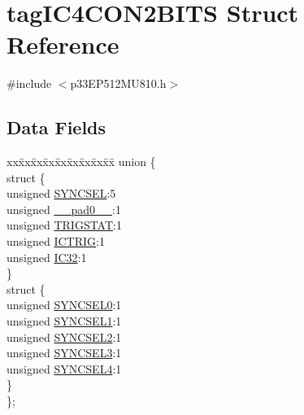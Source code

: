 \hypertarget{structtag_i_c4_c_o_n2_b_i_t_s}{}\section{tag\+I\+C4\+C\+O\+N2\+B\+I\+TS Struct Reference}
\label{structtag_i_c4_c_o_n2_b_i_t_s}


{\ttfamily \#include $<$p33\+E\+P512\+M\+U810.\+h$>$}

\subsection*{Data Fields}
\begin{DoxyCompactItemize}
\item 
\begin{tabbing}
xx\=xx\=xx\=xx\=xx\=xx\=xx\=xx\=xx\=\kill
union \{\\
\>struct \{\\
\>\>unsigned \hyperlink{structtag_i_c4_c_o_n2_b_i_t_s_a35fbbe11485c2615ed27535b62c3fa35}{SYNCSEL}:5\\
\>\>unsigned \hyperlink{structtag_i_c4_c_o_n2_b_i_t_s_adf71f3d8410c1f1dbbc96680a92c49af}{\_\_pad0\_\_}:1\\
\>\>unsigned \hyperlink{structtag_i_c4_c_o_n2_b_i_t_s_ab379549de54ac93ad4aa73686c34cb7c}{TRIGSTAT}:1\\
\>\>unsigned \hyperlink{structtag_i_c4_c_o_n2_b_i_t_s_a79bd14cfd2e403f3a96ce0b3bb58097b}{ICTRIG}:1\\
\>\>unsigned \hyperlink{structtag_i_c4_c_o_n2_b_i_t_s_afc705120246cb4ca0c93c87817519b7f}{IC32}:1\\
\>\} \\
\>struct \{\\
\>\>unsigned \hyperlink{structtag_i_c4_c_o_n2_b_i_t_s_a3b5df3154fde5141e6ac0156425ff8b4}{SYNCSEL0}:1\\
\>\>unsigned \hyperlink{structtag_i_c4_c_o_n2_b_i_t_s_a50e73f95ab1c258ddc64f69c0991deaf}{SYNCSEL1}:1\\
\>\>unsigned \hyperlink{structtag_i_c4_c_o_n2_b_i_t_s_a304907a5d2c4cbf1114a54642a85951e}{SYNCSEL2}:1\\
\>\>unsigned \hyperlink{structtag_i_c4_c_o_n2_b_i_t_s_a6bbd1bd2ead6c9fa713969c6eb0f0c75}{SYNCSEL3}:1\\
\>\>unsigned \hyperlink{structtag_i_c4_c_o_n2_b_i_t_s_a0cd5bbe196c7974953909d27a6307bb7}{SYNCSEL4}:1\\
\>\} \\
\}; \\

\end{tabbing}\end{DoxyCompactItemize}



